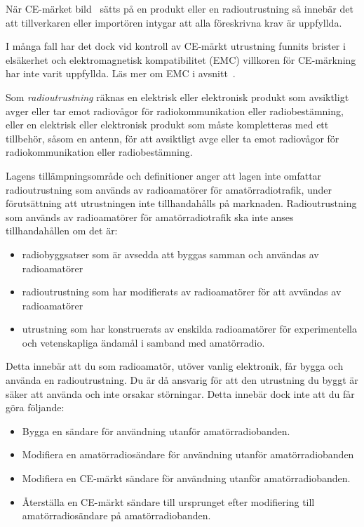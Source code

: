 När CE-märket bild~ sätts på en produkt eller en
radioutrustning så innebär det att tillverkaren eller importören intygar att
alla föreskrivna krav är uppfyllda.

I många fall har det dock vid kontroll av CE-märkt utrustning funnits brister
i elsäkerhet och elektromagnetisk kompatibilitet (EMC) villkoren för CE-märkning
har inte varit uppfyllda. Läs mer om EMC i avsnitt~.

Som \emph{radioutrustning} räknas en elektrisk eller elektronisk produkt som
avsiktligt avger eller tar emot radiovågor för radiokommunikation eller
radiobestämning, eller en elektrisk eller elektronisk produkt som måste
kompletteras med ett tillbehör, såsom en antenn, för att avsiktligt avge
eller ta emot radiovågor för radiokommunikation eller radiobestämning.

Lagens tillämpningsområde och definitioner anger att lagen inte omfattar
radioutrustning som används av radioamatörer för amatörradiotrafik, under
förutsättning att utrustningen inte tillhandahålls på marknaden.
Radioutrustning som används av radioamatörer för amatörradiotrafik ska inte
anses tillhandahållen om det är:

\begin{itemize}
	\item radiobyggsatser som är avsedda att byggas samman och användas av
	radioamatörer
	\item radioutrustning som har modifierats av radioamatörer för att
	avvändas av radioamatörer
	\item utrustning som har konstruerats av enskilda radioamatörer för
	experimentella och vetenskapliga ändamål i samband med amatörradio.
\end{itemize}

Detta innebär att du som radioamatör, utöver vanlig elektronik, får bygga
och använda en radioutrustning.
Du är då ansvarig för att den utrustning du byggt är säker att använda och inte
orsakar störningar.
Detta innebär dock inte att du får göra följande:

\begin{itemize}
	\item Bygga en sändare för användning utanför amatörradiobanden.
	\item Modifiera en amatörradiosändare för användning utanför amatörradiobanden
	\item Modifiera en CE-märkt sändare för användning utanför amatörradiobanden.
	\item Återställa en CE-märkt sändare till ursprunget efter modifiering till
	amatörradiosändare på amatörradiobanden.
\end{itemize}

